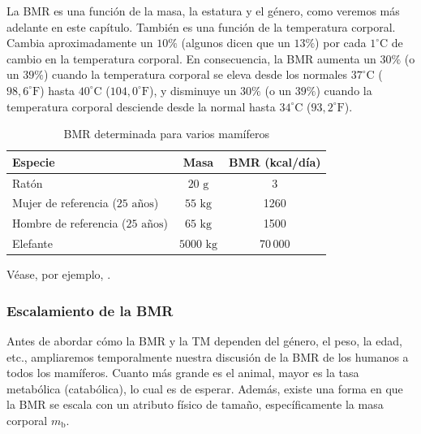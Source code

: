 \documentclass[12pt]{book}
\begin{document}
La BMR es una función de la masa, la estatura y el género, como veremos más adelante en este capítulo. También es una función de la temperatura corporal. Cambia aproximadamente un $10\%$ (algunos dicen que un $13\%$) por cada $1^\circ\text{C}$ de cambio en la temperatura corporal. En consecuencia, la BMR aumenta un $30\%$ (o un $39\%$) cuando la temperatura corporal se eleva desde los normales $37^\circ\text{C}$ ($98,6^\circ\text{F}$) hasta $40^\circ\text{C}$ ($104,0^\circ\text{F}$), y disminuye un $30\%$ (o un $39\%$) cuando la temperatura corporal desciende desde la normal hasta $34^\circ\text{C}$ ($93,2^\circ\text{F}$).

\begin{table}[htbp]
\centering
\caption{BMR determinada para varios mamíferos}
\label{tab:618}
\small
\begin{tabularx}{0.8\textwidth}{Xcc}
\toprule
\textbf{Especie} & \textbf{Masa} & \textbf{BMR (kcal/día)} \\
\midrule
Ratón & $20\text{ g}$ & 3 \\
Mujer de referencia ($25\text{ años}$) & $55\text{ kg}$ & 1260 \\
Hombre de referencia ($25\text{ años}$) & $65\text{ kg}$ & 1500 \\
Elefante & $5000\text{ kg}$ & 70\,000 \\
\bottomrule
\end{tabularx}
\begin{flushleft}
    \small Véase, por ejemplo, \cite{66}.
\end{flushleft}
\end{table}

\subsubsection*{Escalamiento de la BMR}

Antes de abordar cómo la BMR y la TM dependen del género, el peso, la edad, etc., ampliaremos temporalmente nuestra discusión de la BMR de los humanos a todos los mamíferos. Cuanto más grande es el animal, mayor es la tasa metabólica (catabólica), lo cual es de esperar. Además, existe una forma en que la BMR se escala con un atributo físico de tamaño, específicamente la masa corporal $m_{\text{b}}$.
\end{document}
